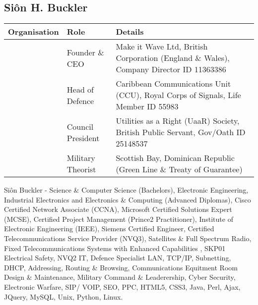 \documentclass[letterpaper,10pt,openany,oneside,english]{sphinxmanual}
\begin{document}
\chapter{}
\label{\detokenize{index:document-author-s}}

\section{Siôn H. Buckler}
\label{\detokenize{index:sion-h-buckler}}

\begin{savenotes}\sphinxattablestart
\centering
\begin{tabulary}{\linewidth}[t]{|T|T|T|}
\hline
\sphinxstyletheadfamily 
Organisation
&\sphinxstyletheadfamily 
Role
&\sphinxstyletheadfamily 
Details
\\
\hline
\noindent{}
&
Founder \& CEO
&
Make it Wave Ltd, British Corporation (England \& Wales), Company Director ID 11363386
\\
\hline
\noindent{}
&
Head of Defence
&
Caribbean Communications Unit (CCU), Royal Corps of Signals, Life Member ID 55983
\\
\hline
\noindent{}
&
Council President
&
Utilities as a Right (UaaR) Society, British Public Servant, Gov/Oath ID 25148537
\\
\hline
\noindent{}
&
Military Theorist
&
Scottish Bay, Dominican Republic (Green Line \& Treaty of Guarantee)
\\
\hline
\end{tabulary}
\par
\sphinxattableend\end{savenotes}

 Siôn Buckler - Science \& Computer Science (Bachelors), Electronic Engineering, Industrial Electronics and Electronics \& Computing (Advanced Diplomas), Cisco Certified Network Associate (CCNA), Microsoft Certified Solutions Expert (MCSE), Certified Project Management (Prince2 Practitioner), Institute of Electronic Engineering (IEEE), Siemens Certified Engineer, Certified Telecommunications Service Provider (NVQ3), Satellites \& Full Spectrum Radio, Fixed Telecommunications Systems with Enhanced Capabilities , SKP01 Electrical Safety, NVQ2 IT, Defence Specialist LAN, TCP/IP, Subnetting, DHCP, Addressing, Routing \& Browsing, Communications Equitment Room Design \& Maintenance, Military Command \& Leaderership,  Cyber Security, Electronic Warfare, SIP/ VOIP, SEO, PPC, HTML5, CSS3, Java, Perl, Ajax, JQuery, MySQL, Unix, Python, Linux.



\renewcommand{\indexname}{Index}
\printindex
\end{document}

